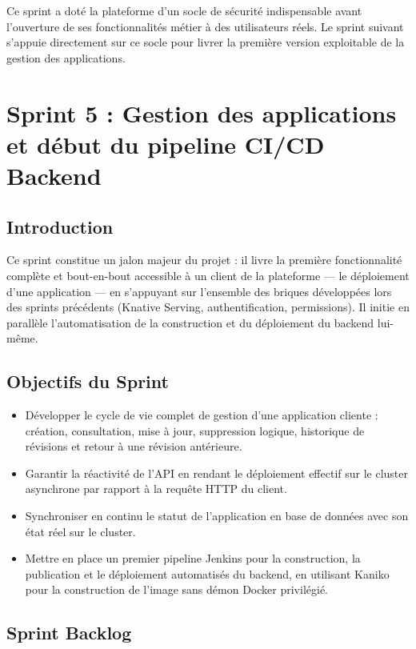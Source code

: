 Ce sprint a doté la plateforme d'un socle de sécurité indispensable avant l'ouverture de ses fonctionnalités métier à des utilisateurs réels. Le sprint suivant s'appuie directement sur ce socle pour livrer la première version exploitable de la gestion des applications.


\section{Sprint 5 : Gestion des applications et début du pipeline CI/CD Backend}

\subsection{Introduction}

Ce sprint constitue un jalon majeur du projet : il livre la première fonctionnalité complète et bout-en-bout accessible à un client de la plateforme — le déploiement d'une application — en s'appuyant sur l'ensemble des briques développées lors des sprints précédents (Knative Serving, authentification, permissions). Il initie en parallèle l'automatisation de la construction et du déploiement du backend lui-même.

\subsection{Objectifs du Sprint}

\begin{itemize}
    \item Développer le cycle de vie complet de gestion d'une application cliente : création, consultation, mise à jour, suppression logique, historique de révisions et retour à une révision antérieure.
    \item Garantir la réactivité de l'API en rendant le déploiement effectif sur le cluster asynchrone par rapport à la requête HTTP du client.
    \item Synchroniser en continu le statut de l'application en base de données avec son état réel sur le cluster.
    \item Mettre en place un premier pipeline Jenkins pour la construction, la publication et le déploiement automatisés du backend, en utilisant Kaniko pour la construction de l'image sans démon Docker privilégié.
\end{itemize}

\subsection{Sprint Backlog}

